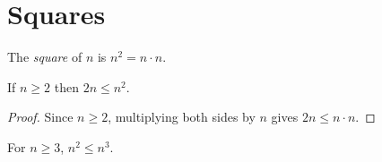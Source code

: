 \chapter{Squares}
\label{chap:squares}

\begin{definition}[Square]
  \label{def:square}
  \leanok
  The \emph{square} of $n$ is $n^2 = n \cdot n$.
\end{definition}

\begin{theorem}
  \label{thm:twice-le-square}
  \leanok
  If $n \ge 2$ then $2n \le n^2$.
\end{theorem}
\begin{proof}
  Since $n \ge 2$, multiplying both sides by $n$ gives $2n \le n \cdot n$.
\end{proof}

\begin{conjecture}[Cubes]
  \label{conj:cube}
  For $n \ge 3$, $n^2 \le n^3$.
\end{conjecture}
